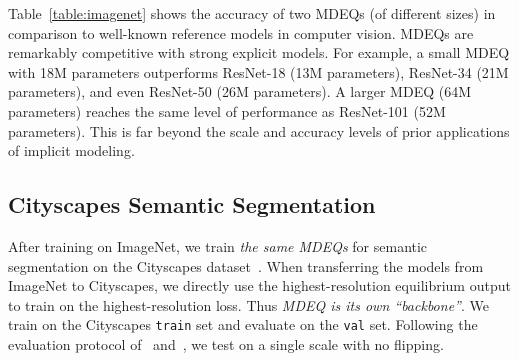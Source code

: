 \documentclass{article}
\begin{document}
Table~\ref{table:imagenet} shows the accuracy of two MDEQs (of different sizes) in comparison to well-known reference models in computer vision. MDEQs are remarkably competitive with strong explicit models. For example, a small MDEQ with 18M parameters outperforms ResNet-18 (13M parameters), ResNet-34 (21M parameters), and even ResNet-50 (26M parameters). A larger MDEQ (64M parameters) reaches the same level of performance as ResNet-101 (52M parameters). This is far beyond the scale and accuracy levels of prior applications of implicit modeling.

\subsection{Cityscapes Semantic Segmentation}

After training on ImageNet, we train \emph{the same MDEQs} for semantic segmentation on the Cityscapes dataset~\cite{cordts2016cityscapes}. When transferring the models from ImageNet to Cityscapes, we directly use the highest-resolution equilibrium output  to train on the highest-resolution loss. Thus \emph{MDEQ is its own ``backbone''}.
We train on the Cityscapes \texttt{train} set and evaluate on the \texttt{val} set. Following the evaluation protocol of~\citet{zhao2018psanet} and~\citet{sun2019high}, we test on a single scale with no flipping.
\end{document}
